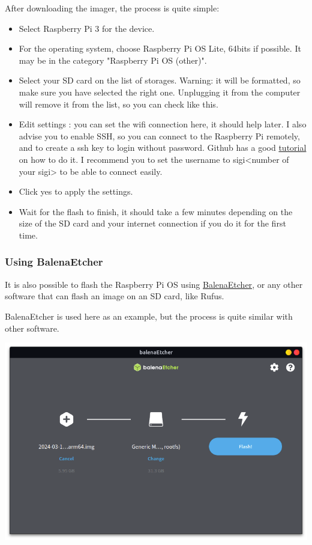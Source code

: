\documentclass{article}
\begin{document}
After downloading the imager, the process is quite simple:

\begin{itemize}
    \item Select Raspberry Pi 3 for the device.
    \item For the operating system, choose Raspberry Pi OS Lite, 64bits if possible. It may be in
        the category "Raspberry Pi OS (other)".
    \item Select your SD card on the list of storages. Warning: it will be formatted, so make sure
        you have selected the right one. Unplugging it from the computer will remove it from the list,
        so you can check like this.
    \item Edit settings : you can set the wifi connection here, it should help later. I also advise
        you to enable SSH, so you can connect to the Raspberry Pi remotely, and to create a ssh key to
        login without password. Github has a good \href{https://docs.github.com/en/authentication/
        connecting-to-github-with-ssh/generating-a-new-ssh-key-and-adding-it-to-the-ssh-agent#
        generating-a-new-ssh-key}{tutorial} on how to do it.
        I recommend you to set the username to sigi<number of your sigi> to be able to connect easily.
    \item Click yes to apply the settings.
    \item Wait for the flash to finish, it should take a few minutes depending on the size of the
        SD card and your internet connection if you do it for the first time.
\end{itemize}

\subsubsection{Using BalenaEtcher}

It is also possible to flash the Raspberry Pi OS using \href{https://etcher.balena.io/
}{BalenaEtcher}, or any other software that can flash an image on an SD card, like Rufus.

BalenaEtcher is used here as an example, but the process is quite similar with other software.

\includegraphics[scale=0.3]{img/etcher_next.png}
\end{document}
